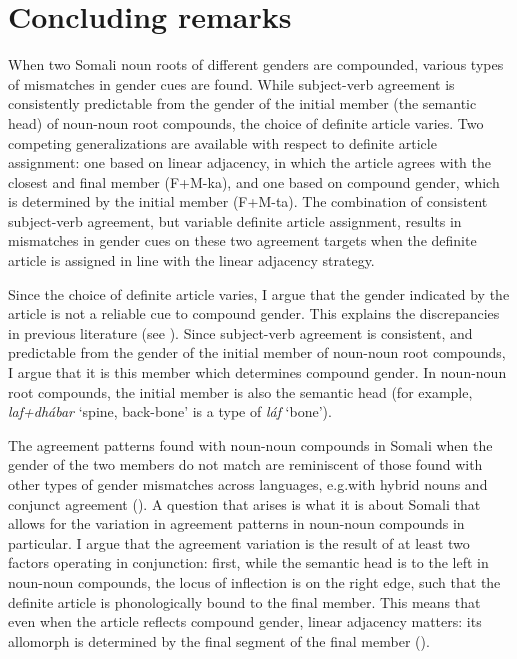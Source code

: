 \documentclass[output=paper]{langscibook}
\begin{document}
\section{Concluding remarks}\label{sec:kaldhol:conclusion}
When two Somali noun roots of different genders are compounded, various types of mismatches in gender cues are found. While subject-verb agreement is consistently predictable from the gender of the initial member (the semantic head) of noun-noun root compounds, the choice of definite article varies. Two competing generalizations are available with respect to definite article assignment: one based on linear adjacency, in which the article agrees with the closest and final member (F+M-ka), and one based on compound gender, which is determined by the initial member (F+M-ta). The combination of consistent subject-verb agreement, but variable definite article assignment, results in mismatches in gender cues on these two agreement targets when the definite article is assigned in line with the linear adjacency strategy.

Since the choice of definite article varies, I argue that the gender indicated by the article is not a reliable cue to compound gender. This explains the discrepancies in previous literature (see ). Since subject-verb agreement is consistent, and predictable from the gender of the initial member of noun-noun root compounds, I argue that it is this member which determines compound gender. In noun-noun root compounds, the initial member is also the semantic head (for example, \textit{laf+dhábar} `spine, back-bone' is a type of \textit{láf} `bone').

The agreement patterns found with noun-noun compounds in Somali when the gender of the two members do not match are reminiscent of those found with other types of gender mismatches across languages, e.g.\@ with hybrid nouns and conjunct agreement (). A question that arises is what it is about Somali that allows for the variation in agreement patterns in noun-noun compounds in particular. I argue that the agreement variation is the result of at least two factors operating in conjunction: first, while the semantic head is to the left in noun-noun compounds, the locus of inflection is on the right edge, such that the definite article is phonologically bound to the final member. This means that even when the article reflects compound gender, linear adjacency matters: its allomorph is determined by the final segment of the final member ().
\end{document}
